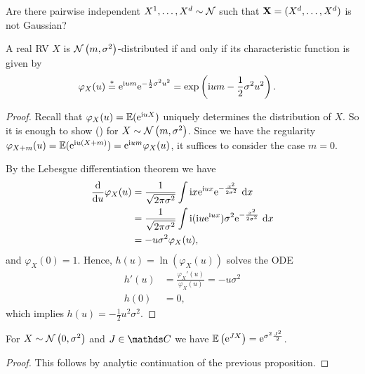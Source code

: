 \begin{ex}
	Are there pairwise independent
	\(X^1, \dots, X^d \sim \mathcal{N}\)
	such that \(\mathbf{X} = (X^d, \dots, X^d)\) is not Gaussian?
\end{ex}

\begin{prop}
A real RV $X$ is $\mathcal{N}\left(m,\sigma^2\right)$-distributed if and only if
its characteristic function is given by
\begin{align*}
	\varphi_X(u)
	&\overset{\ast}= \mathrm{e}^{\mathrm{i} um}\mathrm{e}^{-\frac{1}{2}\sigma^2u^2}
	= \exp\left(\mathrm{i} um - \frac12\sigma^2u^2\right).
\qedhere
\end{align*}
\end{prop}

\begin{proof}
Recall that $\varphi_X(u) = \E[norm]{\e^{\i uX}}$ uniquely determines
the distribution of $X$.
So it is enough to show (\textast)
for $X \sim \mathcal{N}\left(m,\sigma^2\right)$.
Since we have the regularity
$\varphi_{X+m}(u) = \E[norm]{\e^{\i u(X+m)}}=\e^{\i um}\varphi_X(u)$,
it suffices to consider the case $m=0$.

By the Lebesgue differentiation theorem we have
\begin{align*}
\frac{\mathrm{d}}{\mathrm{d}u}\varphi_X(u)&=\frac{1}{\sqrt{2\pi \sigma^2}} \int \mathrm{i} x\mathrm{e}^{\mathrm{i} ux}\mathrm{e}^{-\frac{x^2}{2 \sigma^2}}~\mathrm{d}x\\
&=\frac{1}{\sqrt{2 \pi \sigma^2}} \int \mathrm{i} (\mathrm{i} u \mathrm{e}^{\mathrm{i} ux})\sigma^2 \mathrm{e}^{-\frac{x^2}{2 \sigma^2}}~\mathrm{d}x\\
&=-u \sigma^2 \varphi_X(u),
\end{align*}
and $\varphi_X(0)=1$.
Hence, $h(u)=\ln(\varphi_X(u))$ solves the ODE
\begin{align*}
	h'(u) &= \frac{\varphi_X'(u)}{\varphi_X(u)}=-u \sigma^2\\
	h(0)  &= 0,
\end{align*}
which implies $h(u)=-\frac{1}{2}u^2\sigma^2$.
\end{proof}

\begin{cor}
For $X \sim \mathcal{N}\left(0,\sigma^2\right)$ and $J\in \C$ we have $\E{\e^{JX}}=\e^{\sigma^2 \frac{J^2}{2}}$.
\end{cor}
\begin{proof}
This follows by analytic continuation of the previous proposition.
\end{proof}

